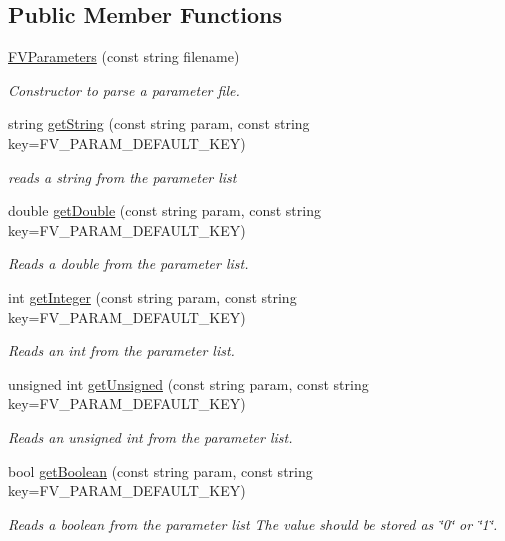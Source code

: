 \subsection*{Public Member Functions}
\begin{DoxyCompactItemize}
\item 
\hyperlink{classFVL_1_1FVParameters_a43bc7ef916c95f29e194a760c941122b}{FVParameters} (const string filename)
\begin{DoxyCompactList}\small\item\em Constructor to parse a parameter file. \item\end{DoxyCompactList}\item 
string \hyperlink{classFVL_1_1FVParameters_aac61dc550dcb6e31afe4953002f160bc}{getString} (const string param, const string key=FV\_\-PARAM\_\-DEFAULT\_\-KEY)
\begin{DoxyCompactList}\small\item\em reads a string from the parameter list \item\end{DoxyCompactList}\item 
double \hyperlink{classFVL_1_1FVParameters_a94c89795cbe50cc22a1fb0f3aea376ff}{getDouble} (const string param, const string key=FV\_\-PARAM\_\-DEFAULT\_\-KEY)
\begin{DoxyCompactList}\small\item\em Reads a double from the parameter list. \item\end{DoxyCompactList}\item 
int \hyperlink{classFVL_1_1FVParameters_ae74403ffa156f556c937aec3b3b94467}{getInteger} (const string param, const string key=FV\_\-PARAM\_\-DEFAULT\_\-KEY)
\begin{DoxyCompactList}\small\item\em Reads an int from the parameter list. \item\end{DoxyCompactList}\item 
unsigned int \hyperlink{classFVL_1_1FVParameters_a37efedfb1ace682dc795b4c766bcac6a}{getUnsigned} (const string param, const string key=FV\_\-PARAM\_\-DEFAULT\_\-KEY)
\begin{DoxyCompactList}\small\item\em Reads an unsigned int from the parameter list. \item\end{DoxyCompactList}\item 
bool \hyperlink{classFVL_1_1FVParameters_a9d27e623d864dd9f38666a23c61f3124}{getBoolean} (const string param, const string key=FV\_\-PARAM\_\-DEFAULT\_\-KEY)
\begin{DoxyCompactList}\small\item\em Reads a boolean from the parameter list The value should be stored as \char`\"{}0\char`\"{} or \char`\"{}1\char`\"{}. \item\end{DoxyCompactList}\end{DoxyCompactItemize}


